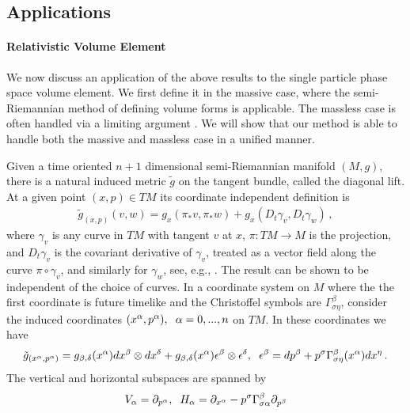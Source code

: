 \subsection{Applications}
\paragraph{Relativistic Volume Element}\label{rel_vol_form}
We now discuss an application of the above results to the single particle phase space volume element. We first define it in the massive case, where the semi-Riemannian method of defining volume forms is applicable.  The massless case is often handled via a limiting argument \cite{tsamparlis}.  We will show that   our method is able to handle both the massive and massless case in a unified manner.

 Given a time oriented $n+1$ dimensional semi-Riemannian manifold $(M,g)$, there is a natural induced metric $\tilde{g}$ on the tangent bundle, called the diagonal lift.  At a given point $(x,p)\in TM$ its coordinate independent definition is
\begin{align}
\tilde{g}_{(x,p)}(v,w)=g_x(\pi_{*} v,\pi_{*} w)+g_x(D_t \gamma_v, D_t \gamma_w)\,,
\end{align}
where $\gamma_v$ is any curve in $TM$ with tangent $v$ at $x$, $\pi:TM\longrightarrow M$ is the projection, and $D_t\gamma_v$ is the covariant derivative of $\gamma_v$, treated as a vector field along the curve $\pi\circ\gamma_v$, and similarly for $\gamma_w$, see, e.g., \cite{pettini}. The result can be shown to be independent of the choice of curves.  In a coordinate system on $M$ where the the first coordinate is future timelike and the Christoffel symbols are $\Gamma^\beta_{\sigma\eta}$, consider the  induced coordinates $(x^\alpha,p^\alpha), \hspace{2mm}\alpha=0,...,n$ on $TM$.  In these coordinates we have 
\begin{equation}
\tilde{g}_{(x^\alpha,p^\alpha)}=g_{\beta,\delta}(x^\alpha)dx^\beta\otimes dx^\delta +g_{\beta,\delta}(x^{\alpha})\epsilon^\beta\otimes \epsilon^\delta, \hspace{2mm} \epsilon^\beta=dp^\beta+p^\sigma\Gamma^\beta_{\sigma\eta}(x^{\alpha})dx^\eta\,.
\end{equation}
The vertical and horizontal subspaces are spanned by
\begin{equation}\label{horizontal_subspace}
V_\alpha=\partial_{p^\alpha}, \hspace{2mm} H_\alpha=\partial_{x^\alpha}-p^\sigma\Gamma_{\sigma\alpha}^\beta\partial_{p^\beta}
\end{equation}
